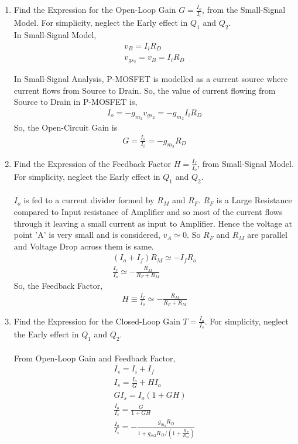 \begin{enumerate}[label=\thesubsection.\arabic*.,ref=\thesubsection.\theenumi]
\item Find the Expression for the Open-Loop Gain $G=\frac{I_{o}}{I_{i}}$, from the Small-Signal Model. For simplicity, neglect the Early effect in $Q_{1}$ and $Q_{2}$.\\
\solution
In Small-Signal Model,
\begin{align}
v_{B} = I_{i}R_{D}\\
v_{gs_{2}} = v_{B} = I_{i}R_{D}
\end{align}

In Small-Signal Analysis, P-MOSFET is modelled as a current source where current flows from Source to Drain. So, the value of current flowing from Source to Drain in P-MOSFET is,
\begin{align}
I_{o} =  -g_{m_{2}}v_{gs_{2}} = -g_{m_{2}}I_{i}R_{D}
\end{align}
So, the Open-Circuit Gain is
\begin{align}
G = \frac{I_{o}}{I_{i}} =  -g_{m_{2}}R_{D}
\end{align}

\item Find the Expression of the Feedback Factor $H = \frac{I_{f}}{I_{o}}$, from Small-Signal Model. For simplicity, neglect the Early effect in $Q_{1}$ and $Q_{2}$.\\
\solution\\
$I_{o}$ is fed to a current divider formed by $R_{M}$ and $R_{F}$.
$R_{F}$ is a Large Resistance compared to Input resistance of Amplifier and so most of the current flows through it leaving a small current as input to Amplifier. Hence the voltage at point 'A' is very small and is considered, $v_{A} \simeq 0$. So $R_{F}$ and $R_{M}$ are parallel and Voltage Drop across them is same.
\begin{align}
(I_{o} + I_{f})R_{M} \simeq -I_{f}R_{o}\\
\frac{I_{f}}{I_{o}} \simeq -\frac{R_{M}}{R_{F}+R_{M}}
\end{align}
So, the Feedback Factor,
\begin{align}
H \equiv \frac{I_{f}}{I_{o}} \simeq-\frac{R_{M}}{R_{F}+R_{M}}
\end{align}
\item Find the Expression for the Closed-Loop Gain $T=\frac{I_{o}}{I_{s}}$. For simplicity, neglect the Early effect in $Q_{1}$ and $Q_{2}$.\\
\solution \\
From Open-Loop Gain and Feedback Factor,
\begin{align}
I_{s} = I_{i} + I_{f}\\
I_{s} = \frac{I_{o}}{G} + H I_{o}\\
GI_{s} = I_{o}(1+GH)\\
\frac{I_{o}}{I_{s}} = \frac{G}{1+GH}\\
\frac{I_{o}}{I_{s}}=-\frac{g_{m_{2}} R_{D}}{1+g_{m{2}} R_{D} /\left(1+\frac{R_{F}}{R_{M}}\right)}
\end{align}


\end{enumerate}
